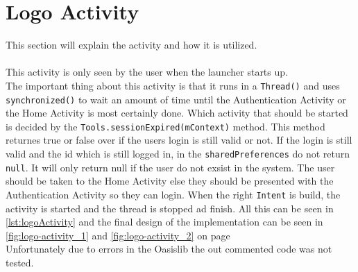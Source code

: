 \section{Logo Activity}
This section will explain the activity  and how it is utilized.\\\\
This activity is only seen by the user when the launcher starts up.\\
The important thing about this activity is that it runs in a \verb+Thread()+ and uses \verb+synchronized()+ to wait an amount of time until the Authentication Activity or the Home Activity is most certainly done. Which activity that should be started is decided by the \verb+Tools.sessionExpired(mContext)+ method. 
This method returnes true or false over if the users login is still valid or not. If the login is still valid and the id which is still logged in, in the \verb+sharedPreferences+ do not return \verb+null+.
It will only return null if the user do not exsist in the system. The user should be taken to the Home Activity else they should be presented with the Authentication Activity so they can login.
When the right \verb+Intent+ is build, the activity is started and the thread is stopped ad finish.
All this can be seen in \autoref{lst:logoActivity} and the final design of the implementation can be seen in \autoref{fig:logo-activity_1} and \autoref{fig:logo-activity_2} on page \\
Unfortunately due to errors in the Oasislib the out commented code was not tested.


